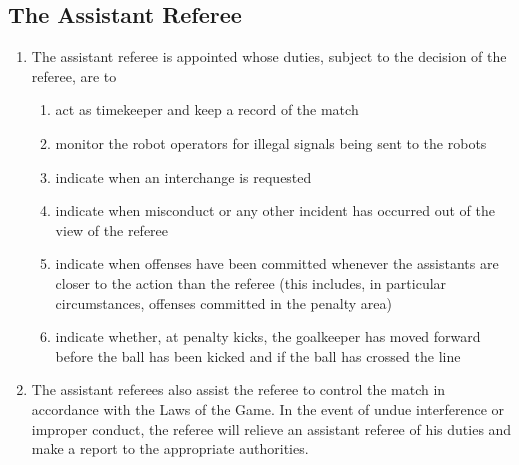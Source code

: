 \documentclass[12pt]{article}
\newcounter{law}[section]
\newcommand{\law}[2][Law]{ %
  \refstepcounter{law} %
  \renewcommand\thesubsection{#1-\arabic{law}} %
  \subsection{\hfill #2} %
}
\newenvironment{lawlist}[1][Law]{ %
  \begin{enumerate} %
    \renewcommand{\theenumi}{#1-\arabic{law}.\arabic{enumi}}} %
  {\end{enumerate}}
\begin{document}
\law{The Assistant Referee}
\label{law:assistant-referee}

\begin{lawlist}
\item The assistant referee is appointed whose duties, subject to
  the decision of the referee, are to 
  \begin{enumerate}
  \item act as timekeeper and keep a record of the match
  \item monitor the robot operators for illegal signals being sent
    to the robots
  \item indicate when an interchange is requested
  \item indicate when misconduct or any other incident has
    occurred out of the view of the referee
  \item indicate when offenses have been committed whenever the
    assistants are closer to the action than the referee (this
    includes, in particular circumstances, offenses committed in
    the penalty area)
  \item indicate whether, at penalty kicks, the goalkeeper has
    moved forward before the ball has been kicked and if the ball
    has crossed the line
  \end{enumerate}
  
\item The assistant referees also assist the referee to control
  the match in accordance with the Laws of the Game. In the event
  of undue interference or improper conduct, the referee will
  relieve an assistant referee of his duties and make a report to
  the appropriate authorities.
\end{lawlist}
\end{document}
